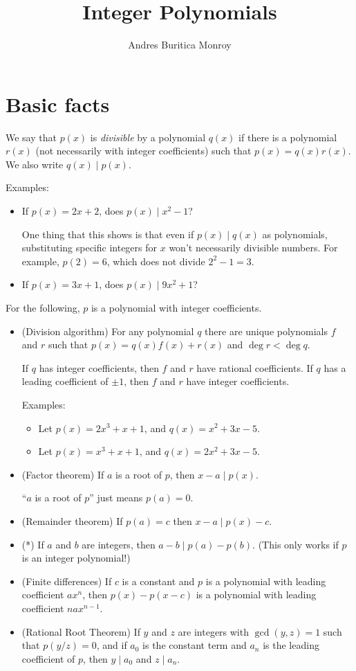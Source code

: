 \documentclass{article}
\title{Integer Polynomials}
\author{Andres Buritica Monroy}
\date{}
\begin{document}
\maketitle
\section{Basic facts}
We say that $p(x)$ is \emph{divisible} by a polynomial $q(x)$ if there is a
polynomial $r(x)$ (not necessarily with integer coefficients) such that
$p(x)=q(x)r(x)$. We also write $q(x)\mid p(x)$.

Examples:
\begin{itemize}
	\item If $p(x)=2x+2$, does $p(x)\mid x^2-1$?

	      One thing that this shows is that even if $p(x)\mid q(x)$ as
	      polynomials, substituting specific integers for $x$ won't necessarily
	      divisible numbers. For example, $p(2)=6$, which does not divide
	      $2^2-1=3$.
	\item If $p(x)=3x+1$, does $p(x)\mid 9x^2+1$?
\end{itemize}
For the following, $p$ is a polynomial with integer coefficients.
\begin{itemize}
	\item (Division algorithm) For any polynomial $q$ there are unique
	      polynomials $f$ and $r$ such that $p(x)=q(x)f(x)+r(x)$ and $\deg r<\deg q$.

	      If $q$ has integer coefficients, then $f$ and $r$ have rational
	      coefficients. If $q$ has a leading coefficient of $\pm 1$, then $f$ and $r$
	      have integer coefficients.

	      Examples:
	      \begin{itemize}
		      \item Let $p(x)=2x^3+x+1$, and $q(x)=x^2+3x-5$.
		      \item Let $p(x)=x^3+x+1$, and $q(x)=2x^2+3x-5$.
	      \end{itemize}
	\item (Factor theorem) If $a$ is a root of $p$, then $x-a\mid p(x)$.

	      ``$a$ is a root of $p$'' just means $p(a)=0$.
	\item (Remainder theorem) If $p(a)=c$ then $x-a\mid p(x)-c$.
	\item (*) If $a$ and $b$ are integers, then $a-b\mid p(a)-p(b)$. (This only
	      works if $p$ is an integer polynomial!)
	\item (Finite differences) If $c$ is a constant and $p$ is a polynomial with
	      leading coefficient $ax^n$, then $p(x)-p(x-c)$ is a polynomial with
	      leading coefficient $nax^{n-1}$.
	\item (Rational Root Theorem) If $y$ and $z$ are integers with $\gcd(y,z)=1$
	      such that $p(y/z)=0$, and if $a_0$ is the constant term and $a_n$ is
	      the leading coefficient of $p$, then $y\mid a_0$ and $z\mid a_n$.
\end{itemize}
\end{document}
